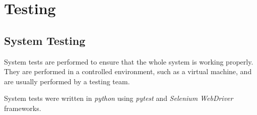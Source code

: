 \chapter{Testing} \label{ch:testing}

\section{System Testing}

System tests are performed to ensure that the whole system is working properly. They are performed in a controlled environment, such as a virtual machine, and are usually performed by a testing team.

System tests were written in \textit{python} using \textit{pytest} \cite{pytest} and \textit{Selenium WebDriver} \cite{selenium} frameworks.